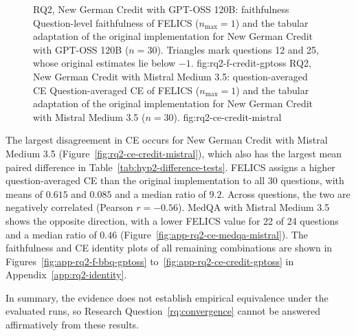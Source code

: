 \begin{figure}[htb]
  \centering
    {RQ2, New German Credit with GPT-OSS 120B: faithfulness}%
    {Question-level faithfulness of FELICS ($n_{\max}=1$) and the tabular adaptation of the original implementation for New German Credit with GPT-OSS 120B ($n=30$). Triangles mark questions 12 and 25, whose original estimates lie below $-1$.}%
    {fig:rq2-f-credit-gptoss}%
  \hfill
    {RQ2, New German Credit with Mistral Medium 3.5: question-averaged CE}%
    {Question-averaged CE of FELICS ($n_{\max}=1$) and the tabular adaptation of the original implementation for New German Credit with Mistral Medium 3.5 ($n=30$).}%
    {fig:rq2-ce-credit-mistral}%
\end{figure}

The largest disagreement in CE occurs for New German Credit with Mistral Medium 3.5 (Figure~\ref{fig:rq2-ce-credit-mistral}), which also has the largest mean paired difference in Table~\ref{tab:hyp2-difference-tests}. FELICS assigns a higher question-averaged CE than the original implementation to all 30 questions, with means of $0.615$ and $0.085$ and a median ratio of $9.2$. Across questions, the two are negatively correlated (Pearson $r=-0.56$). MedQA with Mistral Medium 3.5 shows the opposite direction, with a lower FELICS value for 22 of 24 questions and a median ratio of $0.46$ (Figure~\ref{fig:app-rq2-ce-medqa-mistral}). The faithfulness and CE identity plots of all remaining combinations are shown in Figures~\ref{fig:app-rq2-f-bbq-gptoss} to~\ref{fig:app-rq2-ce-credit-gptoss} in Appendix~\ref{app:rq2-identity}.

In summary, the evidence does not establish empirical equivalence under the evaluated runs, so Research Question~\ref{rq:convergence} cannot be answered affirmatively from these results.

